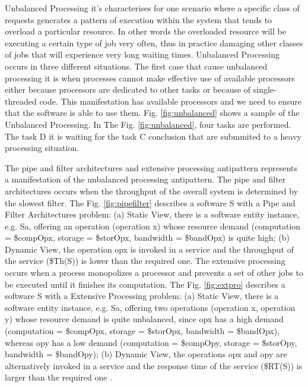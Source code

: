 \documentclass[times]{stvrauth}
\begin{document}
Unbalanced Processing it's characterises for one scenario where a specific class of requests generates a pattern of execution within the system that tends to overload a particular resource. In other words the overloaded resource will be executing a certain type of job very often, thus in practice damaging other classes
of jobs that will experience very long waiting times. Unbalanced Processing occurs in three different situations. The first case that cause unbalanced processing it is when processes cannot make effective use of available processors either because processors are dedicated to other tasks or because of single-threaded code. This manifestation has available processors and we need to ensure that the software is able to use them. Fig. \ref{fig:unbalanced}  shows a sample of the Unbalanced Processing. In The Fig. \ref{fig:unbalanced}, four tasks are performed. The task D it is waiting for the task C conclusion that are submmited to a heavy processing situation. 

The pipe and filter architectures  and extensive processing antipattern represents a manifestation of the unbalanced processing antipattern. The pipe and filter architectures occurs when the throughput of the overall system is determined by the slowest filter. The  Fig. \ref{fig:pipefilter} describes a software S with a Pipe and Filter Architectures problem: (a) Static View, there is a software entity instance, e.g. Sa, offering an operation (operation x) whose resource demand (computation = \$compOpx, storage = \$storOpx, bandwidth = \$bandOpx) is quite high; (b) Dynamic View, the operation opx is invoked in a service  and the throughput of the service (\$Th(S)) is lower than the required one. The extensive processing occurs when a process monopolizes a processor and prevents a set of other jobs to be executed until it finishes its computation. The Fig. \ref{fig:extpro} describes a software S with a Extensive Processing problem: (a) Static View, there is a software entity instance, e.g. Sa, offering two operations (operation x, operation y) whose resource demand is quite unbalanced, since opx has a high demand (computation = \$compOpx, storage = \$storOpx, bandwidth = \$bandOpx), whereas opy has a low demand (computation = \$compOpy, storage = \$storOpy, bandwidth = \$bandOpy); (b) Dynamic View, the operations opx and opy are alternatively invoked in a service and the response time of the service (\$RT(S)) is larger than the required one \cite{Vetoio2011}.
\end{document}
